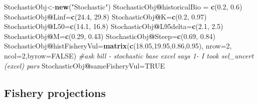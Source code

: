 \documentclass[
]{book}
\newenvironment{Shaded}{\begin{snugshade}}{\end{snugshade}}
\newcommand{\AttributeTok}[1]{\textcolor[rgb]{0.13,0.29,0.53}{#1}}
\newcommand{\CommentTok}[1]{\textcolor[rgb]{0.56,0.35,0.01}{\textit{#1}}}
\newcommand{\ConstantTok}[1]{\textcolor[rgb]{0.56,0.35,0.01}{#1}}
\newcommand{\DecValTok}[1]{\textcolor[rgb]{0.00,0.00,0.81}{#1}}
\newcommand{\FloatTok}[1]{\textcolor[rgb]{0.00,0.00,0.81}{#1}}
\newcommand{\FunctionTok}[1]{\textcolor[rgb]{0.13,0.29,0.53}{\textbf{#1}}}
\newcommand{\NormalTok}[1]{#1}
\newcommand{\OtherTok}[1]{\textcolor[rgb]{0.56,0.35,0.01}{#1}}
\newcommand{\SpecialCharTok}[1]{\textcolor[rgb]{0.81,0.36,0.00}{\textbf{#1}}}
\newcommand{\StringTok}[1]{\textcolor[rgb]{0.31,0.60,0.02}{#1}}
\begin{document}
\begin{Shaded}
\begin{Highlighting}[]
\NormalTok{StochasticObj}\OtherTok{\textless{}{-}}\FunctionTok{new}\NormalTok{(}\StringTok{"Stochastic"}\NormalTok{)}
\NormalTok{StochasticObj}\SpecialCharTok{@}\NormalTok{historicalBio }\OtherTok{=} \FunctionTok{c}\NormalTok{(}\FloatTok{0.2}\NormalTok{, }\FloatTok{0.6}\NormalTok{)}
\NormalTok{StochasticObj}\SpecialCharTok{@}\NormalTok{Linf}\OtherTok{=}\FunctionTok{c}\NormalTok{(}\FloatTok{24.4}\NormalTok{, }\FloatTok{29.8}\NormalTok{)}
\NormalTok{StochasticObj}\SpecialCharTok{@}\NormalTok{K}\OtherTok{=}\FunctionTok{c}\NormalTok{(}\FloatTok{0.2}\NormalTok{, }\FloatTok{0.97}\NormalTok{)}
\NormalTok{StochasticObj}\SpecialCharTok{@}\NormalTok{L50}\OtherTok{=}\FunctionTok{c}\NormalTok{(}\FloatTok{14.1}\NormalTok{, }\FloatTok{16.8}\NormalTok{)}
\NormalTok{StochasticObj}\SpecialCharTok{@}\NormalTok{L95delta}\OtherTok{=}\FunctionTok{c}\NormalTok{(}\FloatTok{2.1}\NormalTok{, }\FloatTok{2.5}\NormalTok{)}
\NormalTok{StochasticObj}\SpecialCharTok{@}\NormalTok{M}\OtherTok{=}\FunctionTok{c}\NormalTok{(}\FloatTok{0.29}\NormalTok{, }\FloatTok{0.43}\NormalTok{)}
\NormalTok{StochasticObj}\SpecialCharTok{@}\NormalTok{Steep}\OtherTok{=}\FunctionTok{c}\NormalTok{(}\FloatTok{0.69}\NormalTok{, }\FloatTok{0.84}\NormalTok{)}
\NormalTok{StochasticObj}\SpecialCharTok{@}\NormalTok{histFisheryVul}\OtherTok{=}\FunctionTok{matrix}\NormalTok{(}\FunctionTok{c}\NormalTok{(}\FloatTok{18.05}\NormalTok{,}\FloatTok{19.95}\NormalTok{,}\FloatTok{0.86}\NormalTok{,}\FloatTok{0.95}\NormalTok{), }\AttributeTok{nrow=}\DecValTok{2}\NormalTok{, }\AttributeTok{ncol=}\DecValTok{2}\NormalTok{,}\AttributeTok{byrow=}\ConstantTok{FALSE}\NormalTok{)  }\CommentTok{\#ask bill {-} stochastic base excel says 1{-} I took sel\_uncert (excel) pars}
\NormalTok{StochasticObj}\SpecialCharTok{@}\NormalTok{sameFisheryVul}\OtherTok{=}\ConstantTok{TRUE}
\end{Highlighting}
\end{Shaded}

\subsection{Fishery projections}\label{fishery-projections-1}
\end{document}
